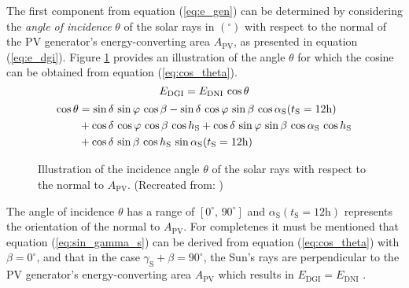 The first component from equation (\ref{eq:e_gen}) can be determined by considering the \emph{angle of incidence} $\theta$ of the solar rays in $\left( ^\circ \right)$ with respect to the normal of the PV generator's energy-converting area $A_{\mathrm{PV}}$, as presented in equation (\ref{eq:e_dgi}). Figure \ref{fig:tikz_angle_theta} provides an illustration of the angle $\theta$ for which the cosine can be obtained from equation (\ref{eq:cos_theta}).
	\begin{equation} \label{eq:e_dgi}
	\centering
		E_{\mathrm{DGI}} = E_{\mathrm{DNI}} \, \cos \theta
	\end{equation}
	\begin{equation} \label{eq:cos_theta}
	\centering
		\begin{aligned}
		\cos \theta &= \sin \delta \, \sin \varphi \, \cos \beta - \sin \delta \, \cos \varphi \, \sin \beta \, \cos \alpha_{\mathrm{S}}(t_\mathrm{S} = 12\mathrm{h}) \\
		&+ \cos \delta \, \cos \varphi \, \cos \beta \, \cos h_{\mathrm{S}} + \cos \delta \, \sin \varphi \, \sin \beta \, \cos \alpha_{\mathrm{S}} \, \cos h_{\mathrm{S}} \\ &+ \cos \delta \, \sin \beta \, \cos h_{\mathrm{S}} \, \sin \alpha_{\mathrm{S}}(t_\mathrm{S} = 12\mathrm{h})
		\end{aligned}
	\end{equation}
\begin{figure}[h!]
	\centering
	
	\caption{Illustration of the incidence angle $\theta$ of the solar rays with respect to the normal to $A_\mathrm{PV}$. (Recreated from: \cite{Landis:1995})}
	\label{fig:tikz_angle_theta}
\end{figure}
The angle of incidence $\theta$ has a range of $\left[0^\circ \text{, } 90^\circ\right]$ and $\alpha_\mathrm{S}(t_\mathrm{S} = 12\mathrm{h})$ represents the orientation of the normal to $A_\mathrm{PV}$. For completenes it must be mentioned that equation (\ref{eq:sin_gamma_s}) can be derived from equation (\ref{eq:cos_theta}) with $\beta = 0^\circ$, and that in the case $\gamma_{\mathrm{S}} + \beta = 90^\circ$, the Sun's rays are perpendicular to the PV generator's energy-converting area $A_{\mathrm{PV}}$ which results in $E_{\mathrm{DGI}} = E_{\mathrm{DNI}}$ \cite{Landis:1995, Bertol:2011, Mertens:2015, Wagner:2018}.


